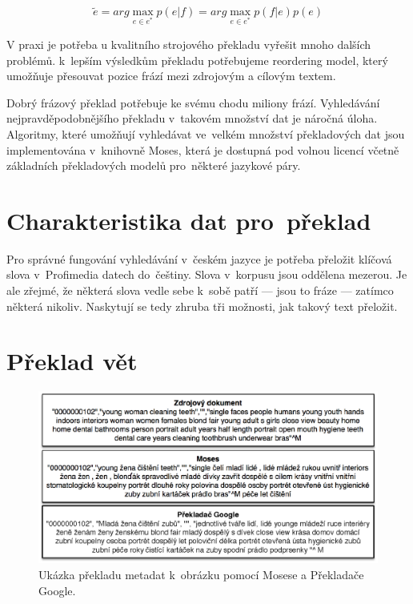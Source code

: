 \begin{equation}
 \tilde{e} = arg \max_{e \in e^*} p(e|f) = arg \max_{e\in e^*} p(f|e) p(e) 
\end{equation}

V praxi je potřeba u kvalitního strojového překladu vyřešit mnoho dalších problémů. k~lepším výsledkům překladu potřebujeme reordering model, který umožňuje přesouvat pozice frází mezi zdrojovým a cílovým textem. 

Dobrý frázový překlad potřebuje ke svému chodu miliony frází. Vyhledávání nejpravděpodobnějšího překladu v~takovém množství dat je náročná úloha. Algoritmy, které umožňují vyhledávat ve~velkém množství překladových dat jsou implementována v~knihovně Moses\cite{moses}, která je dostupná pod volnou licencí včetně základních překladových modelů pro~některé jazykové páry.

\section{Charakteristika dat pro~překlad}

Pro správné fungování vyhledávání v~českém jazyce je potřeba přeložit klíčová slova v~Profimedia datech do~češtiny. Slova v~korpusu jsou oddělena mezerou. Je ale zřejmé, že některá slova vedle sebe k~sobě patří --- jsou to fráze --- zatímco některá nikoliv. Naskytují se tedy zhruba tři možnosti, jak takový text přeložit.


\section{Překlad vět}

\begin{figure}[h]
  \centering
  \includegraphics[width=150mm]{translate.eps}
  \caption{Ukázka překladu metadat k~obrázku pomocí Mosese a Překladače Google.}
  \label{fig:translate}
\end{figure}

